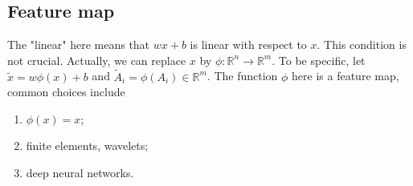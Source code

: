 \subsection{Feature map}

\begin{remark}
The "linear" here means that $wx+b$ is linear with respect to $x$. This condition is not crucial. Actually, we can replace $x$ by $\phi: \mathbb{R}^n\rightarrow \mathbb{R}^m$. To be specific, let  $\tilde x=w\phi(x)+b$ and $\tilde A_i=\phi (A_i)\in \mathbb{R}^m$. The function $\phi$ here is a feature map, 
common choices include
\begin{enumerate}
\item $\phi(x)=x$;
\item finite elements, wavelets;
\item deep neural networks.
\end{enumerate}
\end{remark}


